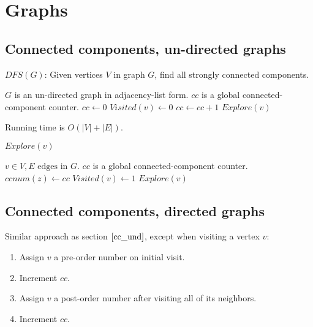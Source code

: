 \documentclass{article}
\begin{document}
	
\listofalgorithms
\section{Graphs}
\subsection{Connected components, un-directed graphs}
\label{cc_und}

\begin{algorithm}
\label{alg:dfs_und}
\caption{$DFS(G)$: Given vertices $V$ in graph $G$, find all strongly connected components.}
\begin{algorithmic}[1]
\REQUIRE $G$ is an un-directed graph in adjacency-list form.
\REQUIRE $cc$ is a global connected-component counter.
\STATE $cc \gets 0$
\STATE $Visited(v) \gets 0$
\ENDFOR
{}
	\STATE $cc \gets cc + 1$
	\STATE $Explore(v)$
\ENDIF
\ENDFOR
\end{algorithmic}
 Running time is $O(|V|+|E|)$.
\end{algorithm}

\begin{algorithm}
\caption{$Explore(v)$}
\begin{algorithmic}[1]
\REQUIRE $v \in V, E \text{ edges in } G$.
\REQUIRE $cc$ is a global connected-component counter.
\STATE $ccnum(z) \gets cc$  
\STATE $Visited(v) \gets 1$
	\STATE $Explore(v)$
\ENDIF
\ENDFOR
\end{algorithmic}
\end{algorithm}

\subsection{Connected components, directed graphs}
Similar approach as section $\ref{cc_und}$, except when visiting a vertex $v$: 
\begin{enumerate}
\item Assign $v$ a pre-order number on initial visit.
\item Increment $cc$.
\item Assign $v$ a post-order number after visiting all of its neighbors.
\item Increment $cc$.
\end{enumerate}
\end{document}
